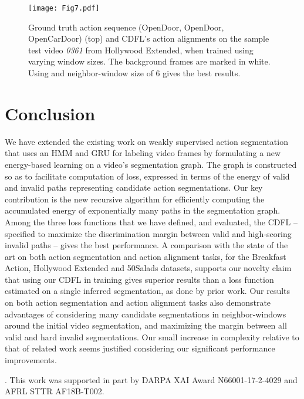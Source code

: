 \documentclass[10pt,twocolumn,letterpaper]{article}
\begin{document}
\begin{figure}
\centering
\texttt{[image: Fig7.pdf]}
\caption{Ground truth action sequence (\textcolor{myturquoise}{OpenDoor}, \textcolor{myturquoise}{OpenDoor}, \textcolor{mymagenta}{OpenCarDoor}) (top) and CDFL's action alignments on the sample test video \textit{0361} from Hollywood Extended, when trained using varying window sizes. The background frames are marked in white. Using \abbrmodel{} and neighbor-window size of $6$ gives the best results. }
\label{fig:diff_win_align}
\vspace{-2mm}
\end{figure}


\section{Conclusion}\label{sec:Conclusion}
We have extended the existing work on weakly supervised action segmentation that uses an HMM and GRU for labeling video frames by formulating a new energy-based learning on a video's segmentation graph. The graph is constructed so as to facilitate computation of loss, expressed in terms of the energy of valid and invalid paths representing candidate action segmentations. Our key contribution is the new recursive algorithm for efficiently computing the accumulated energy of exponentially many paths in the segmentation graph. Among the three loss functions that we have defined, 
and evaluated,
the CDFL -- specified to maximize the discrimination margin between valid and high-scoring invalid paths -- gives the best performance. A comparison with the state of the art on both action segmentation and action alignment tasks, for the Breakfast Action, Hollywood Extended and 50Salads datasets, supports our novelty claim that using our CDFL in training gives superior results than a loss function estimated on a single inferred segmentation, as done by prior work. Our results on both action segmentation and action alignment tasks also demonstrate advantages of considering many candidate segmentations in neighbor-windows around the initial video segmentation, and maximizing the margin between all valid and hard invalid segmentations. Our small increase in complexity relative to that of related work seems justified considering our significant performance improvements.

. This work was supported in part by DARPA XAI Award N66001-17-2-4029 and AFRL STTR AF18B-T002.










{\small


}
\end{document}
